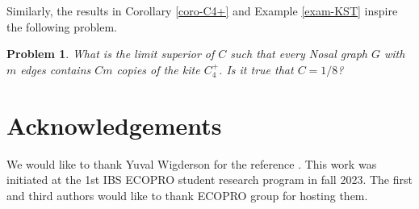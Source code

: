\documentclass[11pt,a4paper]{article}
\newtheorem{problem}[theorem]{Problem}
\theoremstyle{definition}
\theoremstyle{remark}
\begin{document}
Similarly, the results in Corollary \ref{coro-C4+} and Example \ref{exam-KST} inspire the following problem. 

{\color{red} 
\begin{problem} \label{conj-kite}
What is the limit superior of $C$ such that every Nosal graph $G$ with $m$ edges contains $C m$ copies of the kite $C_4^+$. 
Is it true that $C=1/8$? 
\end{problem} 
} 
\fi








\section*{Acknowledgements}
We would like to thank 
Yuval Wigderson for the reference \cite{Erd1969}. This work was initiated at the 1st IBS ECOPRO student research program in fall 2023. The first and third authors would like to thank ECOPRO group for hosting them.  





\frenchspacing

%
%


\end{document}
